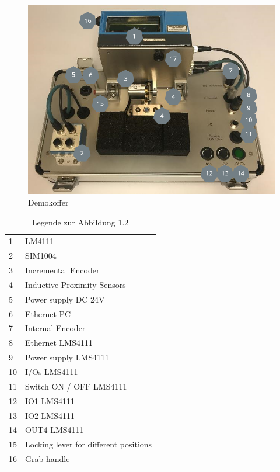 \begin{figure}[h]
\centering
\includegraphics[width=13cm]{Bilder/Demokoffer.png}
\caption{Demokoffer}
\label{Demokoffer}
\end{figure}


\begin{table}[h!]

\begin{tabular}{ll}
1  & LM4111                                \\
2  & SIM1004                               \\
3  & Incremental Encoder                   \\
4  & Inductive Proximity Sensors           \\
5  & Power supply DC 24V                   \\
6  & Ethernet PC                           \\
7  & Internal Encoder                      \\
8  & Ethernet LMS4111                      \\
9  & Power supply LMS4111                  \\
10 & I/Os LMS4111                          \\
11 & Switch ON / OFF LMS4111               \\
12 & IO1 LMS4111                           \\
13 & IO2 LMS4111                           \\
14 & OUT4 LMS4111                          \\
15 & Locking lever for different positions \\
16 & Grab handle                          
\end{tabular}
\caption{Legende zur Abbildung 1.2}
\label{Legende zur Abbildung 12}
\end{table}

